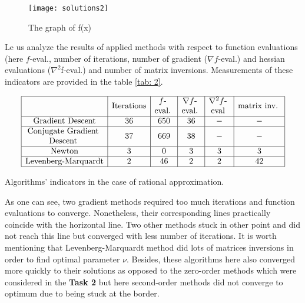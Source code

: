 \documentclass[12pt, bachelor, substylefile = algo_title.rtx]{disser}
\makeatletter
\newcommand{\specialcell}[2][c]{%
  \begin{tabular}[#1]{@{}c@{}}#2\end{tabular}}
\theoremstyle{definition}
\makeatother
\begin{document}
\begin{figure}[h]
\begin{center}
\texttt{[image: solutions2]}
\caption{The graph of f(x)}
\label{fig: 4}
\end{center}
\end{figure}

Le us analyze the results of applied methods with respect to function evaluations (here $f$-eval., number of iterations, number of gradient ($\nabla f$-eval.) and hessian evaluations ($\nabla^2 $f-eval.) and number of matrix inversions. Measurements of these indicators are provided in the table \ref{tab: 2}.

\begin{table}[h]
$$
\begin{array}{|c|c|c|c|c|c|}
\hline
 & \text{Iterations} & \text{\specialcell{ $f$-\\eval.} }& \text{\specialcell{ $\nabla f$-\\eval.} } & \text{\specialcell{ $\nabla^2 f$-\\eval} } & \text{\specialcell{ matrix inv. } }\\
\hline
\text{Gradient Descent} & 36 & 650 & 36 & - & - \\ 
\hline
\text{\specialcell{ Conjugate Gradient\\ Descent } } & 37 & 669 & 38 & - & - \\
\hline
\text{Newton} & 3 & 0 & 3 & 3& 3 \\
\hline
\text{Levenberg-Marquardt} & 2 & 46 & 2 & 2 & 42  \\
\hline
\end{array}
$$
\caption{Algorithms' indicators in the case of rational approximation.}
\label{tab: 2}
\end{table}

As one can see, two gradient methods required too much iterations and function evaluations to converge. Nonetheless, their corresponding lines practically coincide with the horizontal line. Two other methods stuck in other point and did not reach this line but converged with less number of iterations. It is worth mentioning that Levenberg-Marquardt method did lots of matrices inversions in order to find optimal parameter $\nu$.  Besides, these algorithms here also converged more quickly to their solutions as opposed to the zero-order methods which were considered in the \textbf{Task 2} but here second-order methods did not converge to optimum due to being stuck at the border.
\end{document}

